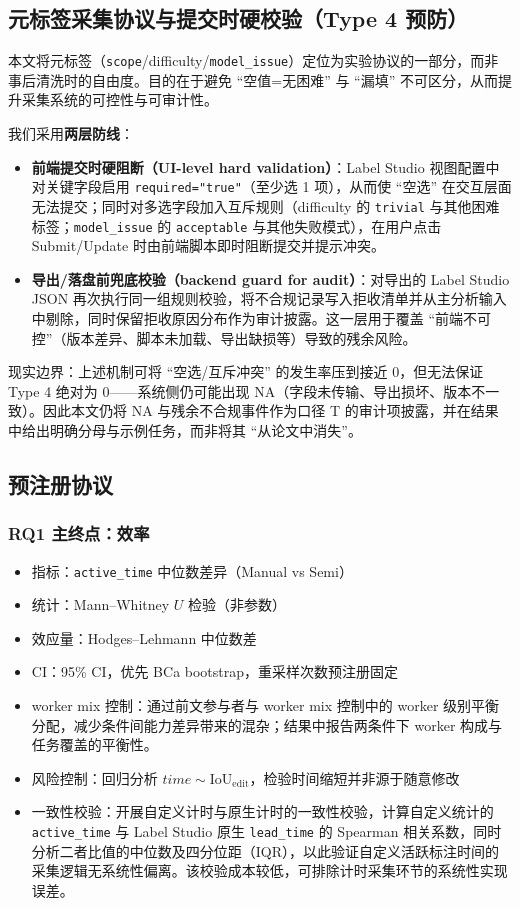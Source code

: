 \subsection{元标签采集协议与提交时硬校验（Type 4 预防）}

本文将元标签（\texttt{scope}/difficulty/\texttt{model\_issue}）定位为实验协议的一部分，而非事后清洗时的自由度。目的在于避免 ``空值=无困难'' 与 ``漏填'' 不可区分，从而提升采集系统的可控性与可审计性。

我们采用\textbf{两层防线}：
\begin{itemize}
    \item \textbf{前端提交时硬阻断（UI-level hard validation）}：Label Studio 视图配置中对关键字段启用 \texttt{required="true"}（至少选 1 项），从而使 ``空选'' 在交互层面无法提交；同时对多选字段加入互斥规则（difficulty 的 \texttt{trivial} 与其他困难标签；\texttt{model\_issue} 的 \texttt{acceptable} 与其他失败模式），在用户点击 Submit/Update 时由前端脚本即时阻断提交并提示冲突。
    \item \textbf{导出/落盘前兜底校验（backend guard for audit）}：对导出的 Label Studio JSON 再次执行同一组规则校验，将不合规记录写入拒收清单并从主分析输入中剔除，同时保留拒收原因分布作为审计披露。这一层用于覆盖 ``前端不可控''（版本差异、脚本未加载、导出缺损等）导致的残余风险。
\end{itemize}

现实边界：上述机制可将 ``空选/互斥冲突'' 的发生率压到接近 0，但无法保证 Type 4 绝对为 0——系统侧仍可能出现 NA（字段未传输、导出损坏、版本不一致）。因此本文仍将 NA 与残余不合规事件作为口径 T 的审计项披露，并在结果中给出明确分母与示例任务，而非将其 ``从论文中消失''。
\subsection{预注册协议}

\subsubsection{RQ1 主终点：效率}
\begin{itemize}
    \item 指标：\texttt{active\_time} 中位数差异（Manual vs Semi）
    \item 统计：Mann--Whitney $U$ 检验（非参数）
    \item 效应量：Hodges–Lehmann 中位数差
    \item CI：95\% CI，优先 BCa bootstrap，重采样次数预注册固定
    \item worker mix 控制：通过前文参与者与 worker mix 控制中的 worker 级别平衡分配，减少条件间能力差异带来的混杂；结果中报告两条件下 worker 构成与任务覆盖的平衡性。
    \item 风险控制：回归分析 $time \sim \mathrm{IoU}_\mathrm{edit}$，检验时间缩短并非源于随意修改
    \item 一致性校验：开展自定义计时与原生计时的一致性校验，计算自定义统计的 \texttt{active\_time} 与 Label Studio 原生 \texttt{lead\_time} 的 Spearman 相关系数，同时分析二者比值的中位数及四分位距（IQR），以此验证自定义活跃标注时间的采集逻辑无系统性偏离。该校验成本较低，可排除计时采集环节的系统性实现误差。
\end{itemize}

